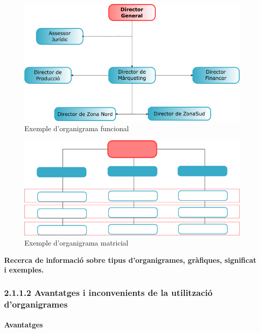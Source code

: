 \documentclass[
  a4paper,
  openany]{book}
\begin{document}
\begin{figure}

{\centering \includegraphics[width=0.8\linewidth]{organigrama} 

}

\caption{Exemple d'organigrama funcional}\label{fig:unnamed-chunk-1}
\end{figure}

\vspace{3cm}

\begin{figure}

{\centering \includegraphics[width=0.8\linewidth]{matricial} 

}

\caption{Exemple d'organigrama matricial}\label{fig:unnamed-chunk-2}
\end{figure}

\textbf{Recerca de informació sobre tipus d'organigrames, gràfiques, significat i exemples.}

\hypertarget{avantatges-i-inconvenients-de-la-utilitzaciuxf3-dorganigrames}{%
\subsubsection{2.1.1.2 Avantatges i inconvenients de la utilització d'organigrames}\label{avantatges-i-inconvenients-de-la-utilitzaciuxf3-dorganigrames}}

\hypertarget{avantatges}{%
\paragraph{Avantatges}\label{avantatges}}
\end{document}
